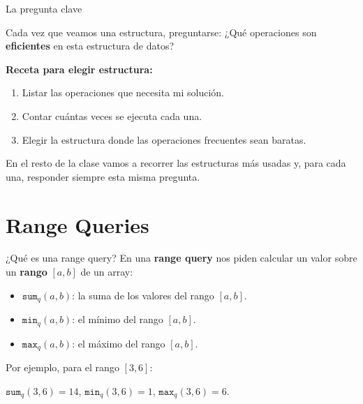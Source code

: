 \documentclass{beamer}
\begin{document}
\begin{frame}{La pregunta clave}
    \begin{alertblock}{Cada vez que veamos una estructura, preguntarse:}
        \centering
        ¿Qué operaciones son \textbf{eficientes} en esta estructura de datos?
    \end{alertblock}
    \vspace{0.3cm}
    \textbf{Receta para elegir estructura:}
    \begin{enumerate}
        \item Listar las operaciones que necesita mi solución.
        \item Contar cuántas veces se ejecuta cada una.
        \item Elegir la estructura donde las operaciones frecuentes sean baratas.
    \end{enumerate}
    \vspace{0.3cm}
    En el resto de la clase vamos a recorrer las estructuras más usadas y,
    para cada una, responder siempre esta misma pregunta.
\end{frame}

\section{Range Queries}

\begin{frame}{¿Qué es una range query?}
    En una \textbf{range query} nos piden calcular un valor sobre un
    \textbf{rango} $[a,b]$ de un array:
    \begin{itemize}
        \item $\texttt{sum}_q(a,b)$: la suma de los valores del rango $[a,b]$.
        \item $\texttt{min}_q(a,b)$: el mínimo del rango $[a,b]$.
        \item $\texttt{max}_q(a,b)$: el máximo del rango $[a,b]$.
    \end{itemize}

    \vspace{0.2cm}
    Por ejemplo, para el rango $[3,6]$:
    \begin{center}
    \end{center}

    \vspace{0.1cm}
    $\texttt{sum}_q(3,6)=14$, \quad $\texttt{min}_q(3,6)=1$, \quad $\texttt{max}_q(3,6)=6$.
\end{frame}
\end{document}
